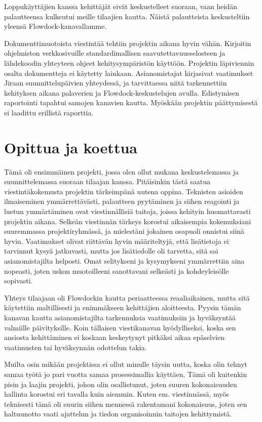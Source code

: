 \documentclass{article}
\begin{document}
Loppukäyttäjien kanssa kehittäjät eivät keskustelleet suoraan, vaan heidän
palautteensa kulkeutui meille tilaajien kautta. Näistä palautteista
keskusteltiin yleensä Flowdock-kanavallamme.

Dokumenttimuotoista viestintää tehtiin projektin aikana hyvin vähän. Kirjoitin
ohjelmiston verkkosivuille standardimallisen saavutettavuusselosteen ja
lähdekoodin yhteyteen ohjeet kehitys\-ympä\-ris\-tön käyttöön. Projektin läpiviennin
osalta dokumentteja ei käytetty lainkaan. Asianomistajat kirjasivat vaatimukset
Jiraan suunnittelupäivien yhteydessä, ja tarvittaessa niitä tarkennettiin
kehi\-tyk\-sen aikana palaverien ja Flow\-dock-keskustelujen avulla.
Edistymisen raportointi tapahtui samo\-jen kanavien kautta. Myöskään projektin
päättymisestä ei laadittu erillistä raporttia.

\section{Opittua ja koettua}

Tämä oli ensimmäinen projekti, jossa olen ollut mukana keskustelemassa ja
suunnittelemassa suoraan tilaajan kanssa. Pitäisinkin tästä saatua
viestintäkokemusta projektin tärkeimpänä uutena oppina. Teknisten asioiden
ilmaiseminen ymmärrettävästi, palautteen pyytäminen ja siihen reagointi ja
luetun ymmärtäminen ovat viestinnällisiä taitoja, joissa kehityin huomattavasti
projektin aikana. Selkeän viestinnän tärkeys korostui aikaisempia kokemuksiani
suuremmassa projektiryhmässä, ja mieles\-tä\-ni jokainen osapuoli onnistui
siinä hyvin. Vaatimukset olivat riittävän hyvin määriteltyjä, että lisätietoja
ei tarvinnut kysyä jatkuvasti, mutta jos lisätiedolle oli tarvetta, sitä sai
asianomistajilta helposti. Omat selitykseni ja kysymykseni ymmärrettiin aina
nopeasti, joten uskon muotoilleeni sanottavani selkeästi ja kohdeyleisölle
sopivasti.

Yhteys tilaajaan oli Flowdockin kautta periaatteessa reaaliaikainen, mutta sitä
käytettiin maltillisesti ja enimmäkseen kehittäjien aloitteesta. Pyysin tämän
kanavan kautta asianomistajilta tarkennuksia vaatimuksiin ja hyväksyntää
valmiille päivityksille. Koin tällaisen viestikanavan hyödylliseksi, koska sen
ansiosta kehittäminen ei koskaan keskeytynyt pitkäksi aikaa epäselvien
vaatimusten tai hyväksynnän odottelun takia.

Muilta osin mikään projektissa ei ollut minulle täysin uutta, koska olin tehnyt
samaa työtä jo pari vuotta samaa prosessimallia käyttäen. Tämä oli kuitenkin
pisin ja laajin projekti, johon olin osallistunut, joten suuren kokonaisuuden
hallinta korostui eri tavalla kuin aiemmin. Kuten em. vies\-tinnässä, myös
teknisesti tämä oli suurin siihen mennessä rakentamani kokonaisuus, joten sen
hal\-tuun\-otto vaati ajattelun ja tiedon organisoinnin taitojen kehittymistä.
\end{document}
